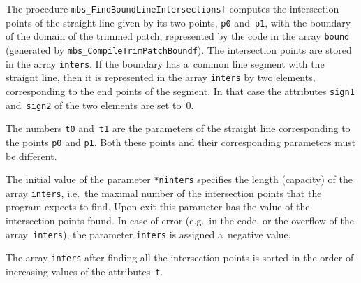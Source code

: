\vspace{\bigskipamount}
\begin{sloppypar}
The procedure \texttt{mbs\_FindBoundLineIntersectionsf} computes the
intersection points of the straight line given by its two
points, \texttt{p0} and~\texttt{p1}, with the boundary of the domain of
the trimmed patch, represented by the code in the array
\texttt{bound} (generated by \texttt{mbs\_CompileTrimPatchBoundf}).
The intersection points are stored in the array \texttt{inters}.
If the boundary has a~common line segment with the straignt line,
then it is represented in the array \texttt{inters} by two elements,
corresponding to the end points of the segment. In that case the
attributes \texttt{sign1} and~\texttt{sign2} of the two elements
are set to~$0$.
\end{sloppypar}

The numbers \texttt{t0} and~\texttt{t1} are the parameters of the straight
line corresponding to the points \texttt{p0} and \texttt{p1}. Both these
points and their corresponding parameters must be different.

The initial value of the parameter \texttt{*ninters} specifies the length
(capacity) of the array \texttt{inters}, i.e.\ the maximal number of
the intersection points that the program expects to find. Upon exit
this parameter has the value of the intersection points found.
In case of error (e.g.\ in the code, or the overflow of the
array~\texttt{inters}), the parameter \texttt{inters} is assigned a~negative
value.

The array \texttt{inters} after finding all the intersection points
is sorted in the order of increasing values of the attributes~\texttt{t}.

